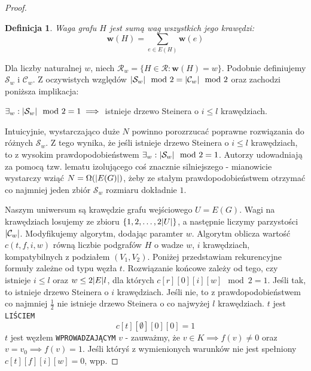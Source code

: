 \documentclass[12pt, oneside]{report}
\newtheorem{definition}{Definicja}
\begin{document}
\begin{proof}
\begin{definition}
\em \emph{Waga grafu $H$} jest sumą wag wszystkich jego krawędzi:
$$\mathbf{w}(H) = \sum_{e \in E(H)} \mathbf{w}(e)$$
\end{definition}
Dla liczby naturalnej $w$, niech $\mathcal{R}_w = \{H \in \mathcal{R} : \mathbf{w}(H) = w\}$. Podobnie definiujemy $\mathcal{S}_w$ i $\mathcal{C}_w$. Z oczywistych względów $\abs{\mathcal{S}_w} \mod 2 = \abs{\mathcal{C}_w} \mod 2$ oraz zachodzi poniższa implikacja:
\begin{center}
$\exists_{w} :\abs{\mathcal{S}_w} \mod 2 = 1 \implies$ istnieje drzewo Steinera o $i \leq l$ krawędziach.
\end{center}

Intuicyjnie, wystarczająco duże $N$ powinno porozrzucać poprawne rozwiązania do różnych $\mathcal{S}_w$. Z tego wynika, że jeśli istnieje drzewo Steinera o $i \leq l$ krawędziach, to z wysokim prawdopodobieństwem $\exists_{w} :\abs{\mathcal{S}_w} \mod 2 = 1$.
Autorzy udowadniają za pomocą tzw. lematu izolującego coś znacznie silniejszego - mianowicie wystarczy wziąć $N = \Omega(\abs{E(G)})$, żeby ze stałym prawdopodobieństwem otrzymać co najmniej jeden zbiór $\mathcal{S}_w$ rozmiaru dokładnie $1$.

Naszym uniwersum są krawędzie grafu wejściowego $U = E(G)$. Wagi na krawędziach losujemy ze zbioru $\{1,2, \ldots, 2 \abs{U}\}$, a następnie liczymy parzystości $\abs{\mathcal{C}_w}$. Modyfikujemy algorytm, dodając paramter $w$. Algorytm oblicza wartość $c(t, f, i, w)$ równą liczbie podgrafów $H$ o wadze $w$, $i$ krawędziach, kompatybilnych z podziałem $(V_1, V_2)$. Poniżej przedstawiam rekurencyjne formuły zależne od typu węzła $t$. Rozwiązanie końcowe zależy od tego, czy istnieje $i \leq l$ oraz $w  \leq 2\abs{E}l$, dla których  $c[r][0][i][w] \mod 2 = 1$. Jeśli tak, to istnieje drzewo Steinera o $i$ krawędziach. Jeśli nie, to z prawdopodobieństwem co najmniej $\frac{1}{2}$ nie istnieje drzewo Steinera o co najwyżej $l$ krawędziach. 
\newline\newline
$t$ jest \texttt{LIŚCIEM}
$$c[t][\emptyset][0][0] = 1$$
\newline
$t$ jest węzłem \texttt{WPROWADZAJĄCYM} $v$ - zauważmy, że $v \in K \implies f(v) \neq 0$ oraz $v = v_0 \implies f(v) = 1$. Jeśli któryś z wymienionych warunków nie jest spełniony $c[t][f][i][w] = 0$, wpp.


\end{proof}
\end{document}
